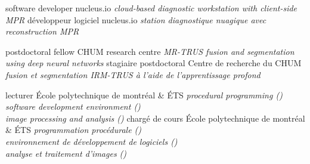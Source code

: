 \documentclass[print]{friggeri-cv}
\begin{document}

\begin{entrylist}
  \engfr
  { {software developer} {nucleus.io} {\emph{cloud-based diagnostic workstation with client-side MPR}}}
  { {développeur logiciel} {nucleus.io} {\emph{station diagnostique nuagique avec reconstruction MPR}}}

  \engfr
  { {postdoctoral fellow} {CHUM research centre} {\emph{MR-TRUS fusion and segmentation using deep neural networks}}}
  { {stagiaire postdoctoral} {Centre de recherche du CHUM} {\emph{fusion et segmentation IRM-TRUS à l'aide de l'apprentissage profond}}}


  \engfr
  { {lecturer} {École polytechnique de montréal \& {\scriptsize ÉTS}} {\emph{procedural programming (\infmat)\\\emph{software development environment (\eleenv)}\\image processing and analysis (\eletr)}}}
  { {chargé de cours} {École polytechnique de montréal \& {\scriptsize ÉTS}} {\emph{programmation procédurale (\infmat)\\\emph{environnement de développement de logiciels (\eleenv)}\\analyse et traitement d'images (\eletr)}}}





\end{entrylist}
\end{document}
